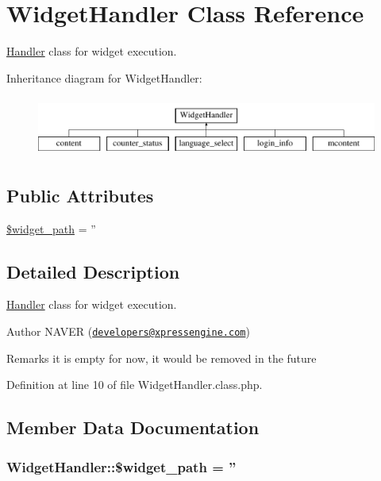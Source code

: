 \hypertarget{classWidgetHandler}{\section{Widget\-Handler Class Reference}
\label{classWidgetHandler}
}


\hyperlink{classHandler}{Handler} class for widget execution.  


Inheritance diagram for Widget\-Handler\-:\begin{figure}[H]
\begin{center}
\leavevmode
\includegraphics[height=2.000000cm]{classWidgetHandler}
\end{center}
\end{figure}
\subsection*{Public Attributes}
\begin{DoxyCompactItemize}
\item 
\hyperlink{classWidgetHandler_a153b7e8baf0e97c152eb6d4dfae17e9d}{\$widget\-\_\-path} = ''
\end{DoxyCompactItemize}


\subsection{Detailed Description}
\hyperlink{classHandler}{Handler} class for widget execution. 

\begin{DoxyAuthor}{Author}
N\-A\-V\-E\-R (\href{mailto:developers@xpressengine.com}{\tt developers@xpressengine.\-com}) 
\end{DoxyAuthor}
\begin{DoxyRemark}{Remarks}
it is empty for now, it would be removed in the future 
\end{DoxyRemark}


Definition at line 10 of file Widget\-Handler.\-class.\-php.



\subsection{Member Data Documentation}
\hypertarget{classWidgetHandler_a153b7e8baf0e97c152eb6d4dfae17e9d}{
\subsubsection[{\$widget\-\_\-path}]{\setlength{\rightskip}{0pt plus 5cm}Widget\-Handler\-::\$widget\-\_\-path = ''}}\label{classWidgetHandler_a153b7e8baf0e97c152eb6d4dfae17e9d}


